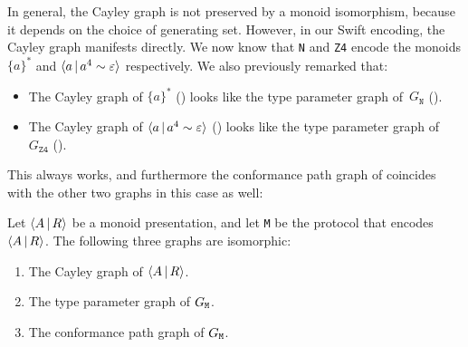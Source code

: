 \documentclass[../generics]{subfiles}
\begin{document}
In general, the Cayley graph is not preserved by a monoid isomorphism, because it depends on the choice of generating set. However, in our Swift encoding, the Cayley graph manifests directly. We now know that \texttt{N} and \texttt{Z4} encode the monoids $\{a\}^*$ and $\langle a\,|\,a^4\sim\varepsilon\rangle$ respectively. We also previously remarked that:
\begin{itemize}
\item The Cayley graph of $\{a\}^*$ () looks like the type parameter graph of~$G_\texttt{N}$ ().
\item The Cayley graph of $\langle a\,|\,a^4\sim\varepsilon\rangle$ () looks like the type parameter graph of~$G_\texttt{Z4}$ ().
\end{itemize}
This always works, and furthermore the conformance path graph of  coincides with the other two graphs in this case as well:
\begin{theorem}
Let $\langle A\,|\,R\rangle$ be a monoid presentation, and let \texttt{M} be the protocol that encodes $\langle A\,|\,R\rangle$. The following three graphs are isomorphic:
\begin{enumerate}
\item The Cayley graph of $\langle A\,|\,R\rangle$.
\item The type parameter graph of $G_\texttt{M}$.
\item The conformance path graph of $G_\texttt{M}$.
\end{enumerate}
\end{theorem}
\end{document}
